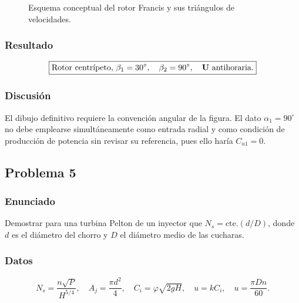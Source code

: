 \documentclass[12pt]{article}
\newcommand{\resultado}[1]{\[
  \boxed{\displaystyle #1}
\]}
\begin{document}
\begin{figure}[H]
\caption{Esquema conceptual del rotor Francis y sus triángulos de velocidades.}
\end{figure}

\subsubsection*{Resultado}
\resultado{\text{Rotor centrípeto, }\beta_1=30^\circ,\quad
\beta_2=90^\circ,\quad \vb U\text{ antihoraria.}}

\subsubsection*{Discusión}
El dibujo definitivo requiere la convención angular de la figura. El dato
$\alpha_1=90^\circ$ no debe emplearse simultáneamente como entrada radial y como condición
de producción de potencia sin revisar su referencia, pues ello haría $C_{u1}=0$.

\subsection{Problema 5}

\subsubsection*{Enunciado}
Demostrar para una turbina Pelton de un inyector que
$N_s=\mathrm{cte.}(d/D)$, donde $d$ es el diámetro del chorro y $D$ el diámetro medio de
las cucharas.

\subsubsection*{Datos}
\[
N_s=\frac{n\sqrt{P}}{H^{5/4}},\quad
A_j=\frac{\pi d^2}{4},\quad
C_i=\varphi\sqrt{2gH},\quad
u=kC_i,\quad u=\frac{\pi Dn}{60}.
\]
\end{document}
